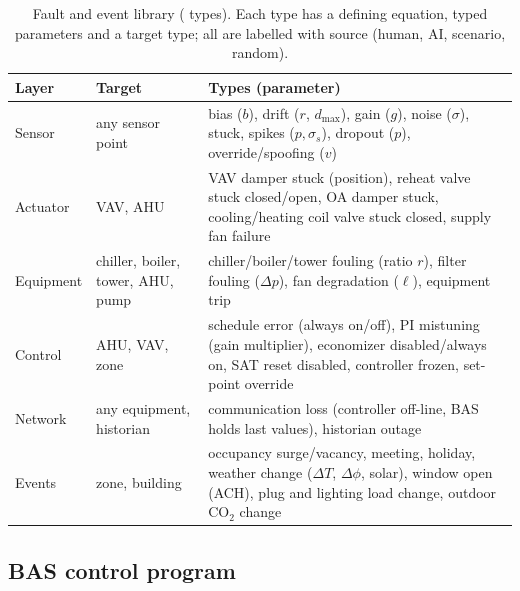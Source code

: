 \documentclass[preprint,12pt,authoryear=false]{elsarticle}
\begin{document}
\begin{table}[t]
\centering\footnotesize
\caption{Fault and event library (\NumFaultTypes{} types). Each type has a defining equation, typed parameters and a
target type; all are labelled with source (human, AI, scenario, random).}
\label{tab:faults}
\begin{tabularx}{\textwidth}{llX}
\toprule
Layer & Target & Types (parameter) \\
\midrule
Sensor & any sensor point & bias ($b$), drift ($r$, $d_{\max}$), gain ($g$), noise ($\sigma$), stuck, spikes ($p,\sigma_s$), dropout ($p$), override/spoofing ($v$) \\
Actuator & VAV, AHU & VAV damper stuck (position), reheat valve stuck closed/open, OA damper stuck, cooling/heating coil valve stuck closed, supply fan failure \\
Equipment & chiller, boiler, tower, AHU, pump & chiller/boiler/tower fouling (ratio $r$), filter fouling ($\Delta p$), fan degradation ($\ell$), equipment trip \\
Control & AHU, VAV, zone & schedule error (always on/off), PI mistuning (gain multiplier), economizer disabled/always on, SAT reset disabled, controller frozen, set-point override \\
Network & any equipment, historian & communication loss (controller off-line, BAS holds last values), historian outage \\
Events & zone, building & occupancy surge/vacancy, meeting, holiday, weather change ($\Delta T$, $\Delta\phi$, solar), window open (ACH), plug and lighting load change, outdoor CO$_2$ change \\
\bottomrule
\end{tabularx}
\end{table}

\subsection{BAS control program}
\end{document}
